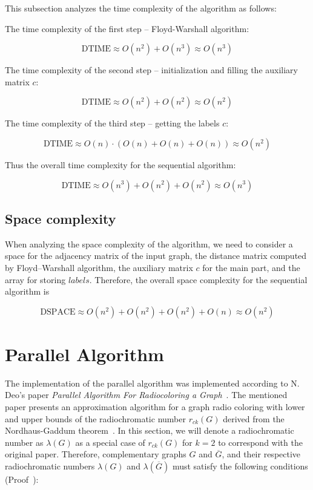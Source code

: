\documentclass[11pt,a4paper]{article}
\begin{document}
This subsection analyzes the time complexity of the algorithm as follows:

The time complexity of the first step -- Floyd-Warshall algorithm:

$$\textrm{DTIME} \approx O(n^2) + O(n^3) \approx O(n^3)$$

The time complexity of the second step -- initialization and filling the auxiliary matrix $c$:

$$\textrm{DTIME} \approx O(n^2) + O(n^2) \approx O(n^2)$$

The time complexity of the third step -- getting the labels $c$:

$$\textrm{DTIME} \approx O(n) \cdot ( O(n) + O(n) + O(n)) \approx O(n^2)$$

Thus the overall time complexity for the sequential algorithm:

$$\textrm{DTIME} \approx O(n^3) + O(n^2) + O(n^2) \approx O(n^3)$$

\subsection{Space complexity}

When analyzing the space complexity of the algorithm, we need to consider a space for the adjacency matrix of the input graph, the distance matrix computed by Floyd–Warshall algorithm, the auxiliary matrix $c$ for the main part, and the array for storing $labels$. Therefore, the overall space complexity for the sequential algorithm is

$$\textrm{DSPACE} \approx O(n^2) + O(n^2) + O(n^2) + O(n) \approx O(n^2)$$


\section{Parallel Algorithm}
\label{sec:alg_parallel}

The implementation of the parallel algorithm was implemented according to N. Deo's paper \emph{Parallel Algorithm For Radiocoloring a Graph}~\cite{deo2003_parallel_radiocoloring}. The mentioned paper presents an approximation algorithm for a graph radio coloring with lower and upper bounds of the radiochromatic number $r_{ck}(G)$ derived from the Nordhaus-Gaddum theorem~\cite{nordhaus1956_compgraphs}. In this section, we will denote a radiochromatic number as $\lambda(G)$ as a special case of $r_{ck}(G)$ for $k=2$ to correspond with the original paper. Therefore, complementary graphs $G$ and $\overline{G}$, and their respective radiochromatic numbers $\lambda(G)$ and $\lambda(\overline{G})$ must satisfy the following conditions (Proof~\cite{deo2003_parallel_radiocoloring}):
\end{document}
